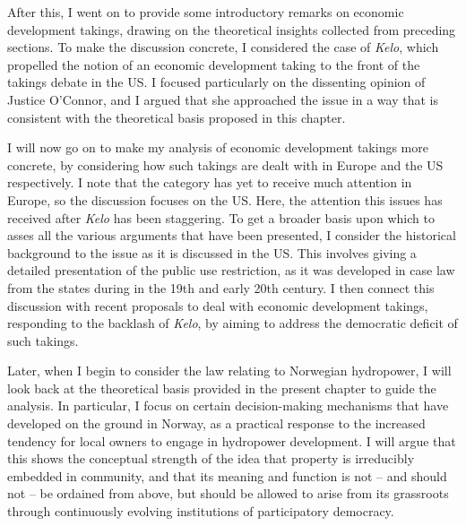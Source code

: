 \documentclass[12pt,a4paper]{book} %
\begin{document}
After this, I went on to provide some introductory remarks on economic development takings, drawing on the theoretical insights collected from preceding sections. To make the discussion concrete, I considered the case of {\it Kelo}, which propelled the notion of an economic development taking to the front of the takings debate in the US. I focused particularly on the dissenting opinion of Justice O'Connor, and I argued that she approached the issue in a way that is consistent with the theoretical basis proposed in this chapter.

I will now go on to make my analysis of economic development takings more concrete, by considering how such takings are dealt with in Europe and the US respectively. I note that the category has yet to receive much attention in Europe, so the discussion focuses on the US. Here, the attention this issues has received after {\it Kelo} has been staggering. To get a broader basis upon which to asses all the various arguments that have been presented, I consider the historical background to the issue as it is discussed in the US. This involves giving a detailed presentation of the public use restriction, as it was developed in case law from the states during in the 19th and early 20th century. I then connect this discussion with recent proposals to deal with economic development takings, responding to the backlash of {\it Kelo}, by aiming to address the democratic deficit of such takings.

Later, when I begin to consider the law relating to Norwegian hydropower, I will look back at the theoretical basis provided in the present chapter to guide the analysis. In particular, I focus on certain decision-making mechanisms that have developed on the ground in Norway, as a practical response to the increased tendency for local owners to engage in hydropower development. I will argue that this shows the conceptual strength of the idea that property is irreducibly embedded in community, and that its meaning and function is not -- and should not -- be ordained from above, but should be allowed to arise from its grassroots through continuously evolving institutions of participatory democracy.

\end{document}
